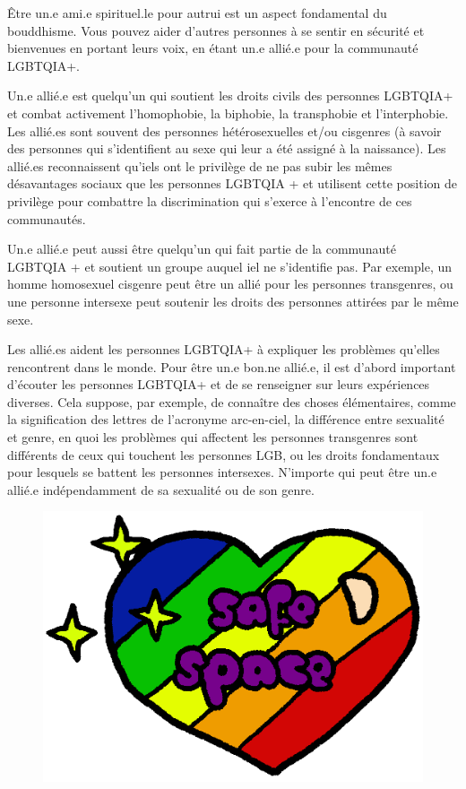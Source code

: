 \documentclass[12pt,openany]{book}
\begin{document}
\noindent Être un.e ami.e spirituel.le pour autrui est un aspect fondamental du bouddhisme. Vous pouvez aider d’autres personnes à se sentir en sécurité et bienvenues en portant leurs voix, en étant un.e allié.e pour la communauté \mbox{LGBTQIA+}.

Un.e allié.e est quelqu’un qui soutient les droits civils des personnes \mbox{LGBTQIA+} et combat activement l'homophobie, la biphobie, la transphobie et l'interphobie. Les allié.es sont souvent des personnes hétérosexuelles et/ou cisgenres (à savoir des personnes qui s’identifient au sexe qui leur a été assigné à la naissance). Les allié.es reconnaissent qu’iels ont le privilège de ne pas subir les mêmes désavantages sociaux que les personnes LGBTQIA + et utilisent cette position de privilège pour combattre la discrimination qui s’exerce à l’encontre de ces communautés.

Un.e allié.e peut aussi être quelqu’un qui fait partie de la communauté LGBTQIA + et soutient un groupe auquel iel ne s’identifie pas. Par exemple, un homme homosexuel cisgenre peut être un allié pour les personnes transgenres, ou une personne intersexe peut soutenir les droits des personnes attirées par le même sexe.

Les allié.es aident les personnes \mbox{LGBTQIA+} à expliquer les problèmes qu’elles rencontrent dans le monde. Pour être un.e bon.ne allié.e, il est d’abord important d’écouter les personnes \mbox{LGBTQIA+} et de se renseigner sur leurs expériences diverses. Cela suppose, par exemple, de connaître des choses élémentaires, comme la signification des lettres de l’acronyme arc-en-ciel, la différence entre sexualité et genre, en quoi les problèmes qui affectent les personnes transgenres sont différents de ceux qui touchent les personnes LGB, ou les droits fondamentaux pour lesquels se battent les personnes intersexes. N’importe qui peut être un.e allié.e indépendamment de sa sexualité ou de son genre.

\begin{figure}[h]
    \centering
    \includegraphics[width=0.4\paperwidth]{12.png}
\end{figure}
\end{document}

